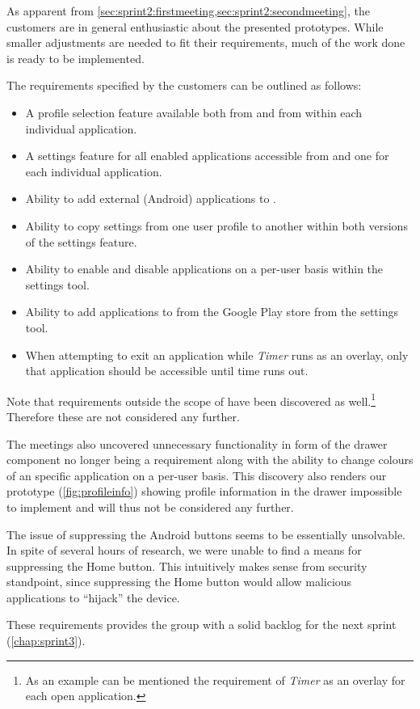 As apparent from \cref{sec:sprint2:firstmeeting,sec:sprint2:secondmeeting}, the customers are in general enthusiastic about the presented prototypes.
While smaller adjustments are needed to fit their requirements, much of the work done is ready to be implemented.

The requirements specified by the customers can be outlined as follows:

\begin{itemize}
\item A profile selection feature available both from \launcher and from within each individual application.
\item A settings feature for all enabled applications accessible from \launcher and one for each individual application.
\item Ability to add external (Android) applications to \launcher.
\item Ability to copy settings from one user profile to another within both versions of the settings feature.
\item Ability to enable and disable applications on a per-user basis within the \launcher settings tool.
\item Ability to add applications to \launcher from the Google Play store from the \launcher settings tool.
\item When attempting to exit an application while \textit{Timer} runs as an overlay, only that application should be accessible until time runs out.
\end{itemize}

Note that requirements outside the scope of \launcher have been discovered as well.\footnote{As an example can be mentioned the requirement of \textit{Timer} as an overlay for each open application.}
Therefore these are not considered any further.

The meetings also uncovered unnecessary functionality in form of the drawer component no longer being a requirement along with the ability to change colours of an specific application on a per-user basis.
This discovery also renders our prototype (\cref{fig:profileinfo}) showing profile information in the drawer impossible to implement and will thus not be considered any further.

The issue of suppressing the Android buttons seems to be essentially unsolvable. In spite of several hours of research, we were unable to find a means for suppressing the Home button. This intuitively makes sense from security standpoint, since suppressing the Home button would allow malicious applications to ``hijack'' the device.

These requirements provides the group with a solid backlog for the next sprint (\cref{chap:sprint3}).
